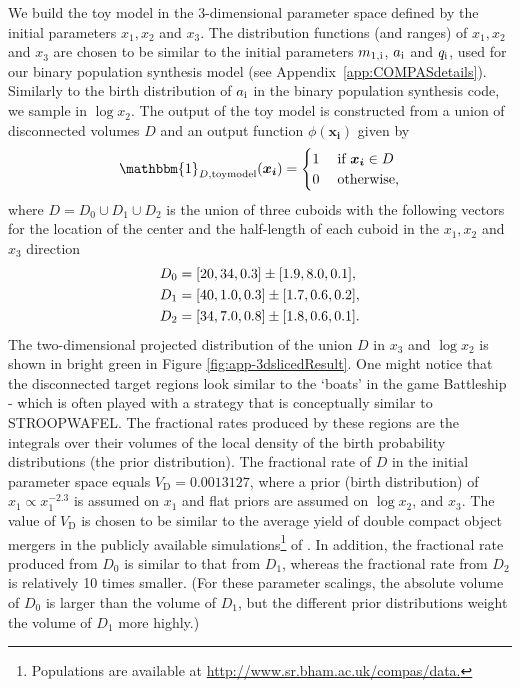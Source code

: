 \documentclass[a4paper,fleqn,usenatbib,useAMS,usedcolumn]{mnras}
\newcommand{\AISs}{\textsc{STROOPWAFEL}}
\newcommand{\CenterZero}{[20, 34, 0.3]}
\newcommand{\EpsilonZero}{[1.9, 8.0, 0.1]}
\newcommand{\CenterOne}{ [40, 1.0, 0.3]}
\newcommand{\EpsilonOne}{[1.7, 0.6, 0.2]}
\newcommand{\CenterTwo}{[34, 7.0, 0.8] }
\newcommand{\EpsilonTwo}{[1.8, 0.6, 0.1]}
\newcommand{\TrueFraction}{0.0013127}
\begin{document}
We build the toy model in the 3-dimensional parameter space defined by the initial parameters $x_1, x_2$ and $x_3$. 
The distribution functions (and ranges) of $x_1, x_2$ and $x_3$ are chosen to be similar to the initial parameters $m_{\rm{1,i}}$, $a_{\rm{i}}$ and $q_{\rm{i}}$, used for our binary population synthesis model (see Appendix~\ref{app:COMPASdetails}). Similarly to the birth distribution of $a_{\rm{i}}$ in the binary population synthesis code, we sample in $\log x_2$.
%
The output of the toy model is constructed from a union of disconnected volumes $D$ and an output function  $\phi(\boldsymbol{x_i})$ given by 
%
\begin{equation}
\mathbbm{1}_{D, \rm{toymodel}}(\boldsymbol{x_i}  ) = \begin{cases} 1 \hspace{0.1cm} &\text{if } \boldsymbol{x_i} \in D \\
	0  &\text{otherwise,} 
	\end{cases}
\end{equation}
where
${D} = D_0 \cup D_1 \cup D_2$ is the union of three cuboids with the following vectors for the location of the center and the half-length of each cuboid in the $x_1, x_2$ and $ x_3$ direction 
%
\begin{align*}
	D_0 &= \CenterZero \pm \EpsilonZero, \notag \\
	D_1 &= \CenterOne \pm \EpsilonOne, \notag \\
	D_2 &= \CenterTwo \pm \EpsilonTwo. \notag \\
\end{align*}
%
The two-dimensional projected distribution of the union $D$ in $x_3$ and $\log x_2$ is shown in bright green in Figure \ref{fig:app-3dslicedResult}. One might notice that the disconnected target regions look similar to the `boats' in the game Battleship - which is often played with a strategy that is conceptually similar to \AISs{}.   The fractional rates produced by these regions are the integrals over their volumes of the local density of the birth probability distributions (the prior distribution).   The fractional rate of $D$ in the initial parameter space equals  $V_{\text{D}} = \TrueFraction$, where a prior  (birth distribution) of  $x_1 \propto x_1^{-2.3}$ is assumed on $x_1$ and flat priors are assumed on $\log x_2$, and $x_3$.  The value of $V_{\text{D}}$ is chosen to be similar to the average yield of double compact object mergers in the publicly available simulations\footnote{Populations are  available at \url{http://www.sr.bham.ac.uk/compas/data.}} of \citet{2018MNRAS.481.4009V}. In addition, the fractional rate produced from  $D_0$ is similar to that from $D_1$, whereas the fractional rate from $D_2$ is relatively 10 times smaller.  (For these parameter scalings, the absolute volume of $D_0$ is larger than the volume of $D_1$, but the different prior distributions weight the volume of $D_1$ more highly.)
\end{document}
